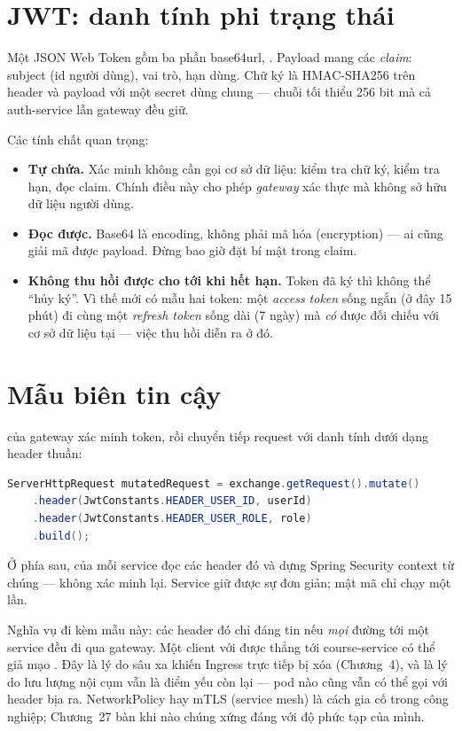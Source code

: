 \section{JWT: danh tính phi trạng thái}

Một JSON Web Token gồm ba phần base64url,
. Payload mang các \emph{claim}: subject
(id người dùng), vai trò, hạn dùng. Chữ ký là HMAC-SHA256 trên header
và payload với một secret dùng chung --- chuỗi tối thiểu 256 bit mà cả
auth-service lẫn gateway đều giữ.

Các tính chất quan trọng:

\begin{itemize}
  \item \textbf{Tự chứa.} Xác minh không cần gọi cơ sở dữ liệu: kiểm tra
  chữ ký, kiểm tra hạn, đọc claim. Chính điều này cho phép
  \emph{gateway} xác thực mà không sở hữu dữ liệu người dùng.
  \item \textbf{Đọc được.} Base64 là encoding, không phải mã hóa
  (encryption) --- ai cũng giải mã được payload. Đừng bao giờ đặt bí mật
  trong claim.
  \item \textbf{Không thu hồi được cho tới khi hết hạn.} Token đã ký thì
  không thể ``hủy ký''. Vì thế mới có mẫu hai token: một \emph{access
  token} sống ngắn (ở đây 15 phút) đi cùng một \emph{refresh token} sống
  dài (7 ngày) mà \emph{có} được đối chiếu với cơ sở dữ liệu tại
   --- việc thu hồi diễn ra ở đó.
\end{itemize}

\section{Mẫu biên tin cậy}
\label{sec:trusted-edge}

 của gateway xác minh token, rồi chuyển
tiếp request với danh tính dưới dạng header thuần:

\begin{lstlisting}[language=Java]
ServerHttpRequest mutatedRequest = exchange.getRequest().mutate()
    .header(JwtConstants.HEADER_USER_ID, userId)
    .header(JwtConstants.HEADER_USER_ROLE, role)
    .build();
\end{lstlisting}

Ở phía sau,  của mỗi service đọc các
header đó và dựng Spring Security context từ chúng --- không xác minh
lại. Service giữ được sự đơn giản; mật mã chỉ chạy một lần.

Nghĩa vụ đi kèm mẫu này: các header đó chỉ đáng tin nếu \emph{mọi}
đường tới một service đều đi qua gateway. Một client với được thẳng tới
course-service có thể giả mạo . Đây là lý do sâu xa
khiến Ingress  trực tiếp bị xóa (Chương~4), và là lý do
lưu lượng nội cụm vẫn là điểm yếu còn lại --- pod nào cũng vẫn có thể
gọi  với header bịa ra. NetworkPolicy hay
mTLS (service mesh) là cách gia cố trong công nghiệp; Chương~27 bàn khi
nào chúng xứng đáng với độ phức tạp của mình.

